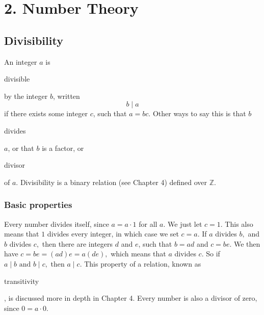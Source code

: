 \documentclass[11pt]{article}
\theoremstyle{plain}
\theoremstyle{definition}
\begin{document}
\section*{2. Number Theory}

\subsection*{Divisibility}

An integer $a$ is \begin{em}divisible\end{em} by the integer $b$, written
$$b \mid a$$
if there exists some integer $c$, such that $ a = bc. $ Other ways to say this is that $b$ \begin{em}divides\end{em} $a$, or that $b$ is a factor, or \begin{em}divisor\end{em} of $a$. Divisibility is a binary relation (see Chapter 4) defined over $\mathbb{Z}$.

\subsubsection*{Basic properties}


Every number divides itself, since $a = a \cdot 1$ for all $a$. We just let $c = 1.$ This also means that $1$ divides every integer, in which case we set $c = a$. If $a$ divides $b,$ and $b$ divides $c,$ then there are integers $d$ and $e$, such that $b = ad$ and $c = be$. We then have $c = be = (ad)e = a(de),$ which means that $a$ divides $c.$ So if $a \mid b \text{ and } b \mid c,$ then $a \mid c.$ This property of a relation, known as \begin{em}transitivity\end{em}, is discussed more in depth in Chapter 4. Every number is also a divisor of zero, since $0 = a \cdot 0$.

%




\end{document}
